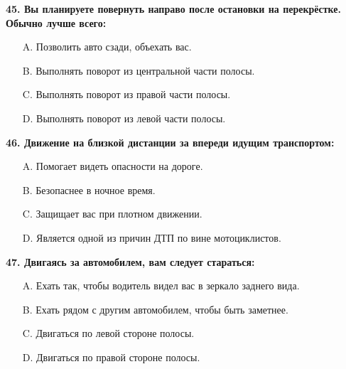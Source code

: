 \begin{minipage}{\linewidth}
\vspace{1em}\noindent\textbf{45. Вы планируете повернуть направо после остановки на перекрёстке. Обычно лучше всего:}

\begin{itemize}[nosep,leftmargin=2em]
\item [A.] Позволить авто сзади, объехать вас.
\item [B.] Выполнять поворот из центральной части полосы.
\item [C.] Выполнять поворот из правой части полосы.
\item [D.] Выполнять поворот из левой части полосы.

\end{itemize}
\end{minipage}


\begin{minipage}{\linewidth}
\vspace{1em}\noindent\textbf{46. Движение на близкой дистанции за впереди идущим транспортом:}

\begin{itemize}[nosep,leftmargin=2em]
\item [A.] Помогает видеть опасности на дороге.
\item [B.] Безопаснее в ночное время.
\item [C.] Защищает вас при плотном движении.
\item [D.] Является одной из причин ДТП по вине мотоциклистов.

\end{itemize}
\end{minipage}


\begin{minipage}{\linewidth}
\vspace{1em}\noindent\textbf{47. Двигаясь за автомобилем, вам следует стараться:}

\begin{itemize}[nosep,leftmargin=2em]
\item [A.] Ехать так, чтобы водитель видел вас в зеркало заднего вида.
\item [B.] Ехать рядом с другим автомобилем, чтобы быть заметнее.
\item [C.] Двигаться по левой стороне полосы.
\item [D.] Двигаться по правой стороне полосы.

\end{itemize}
\end{minipage}


